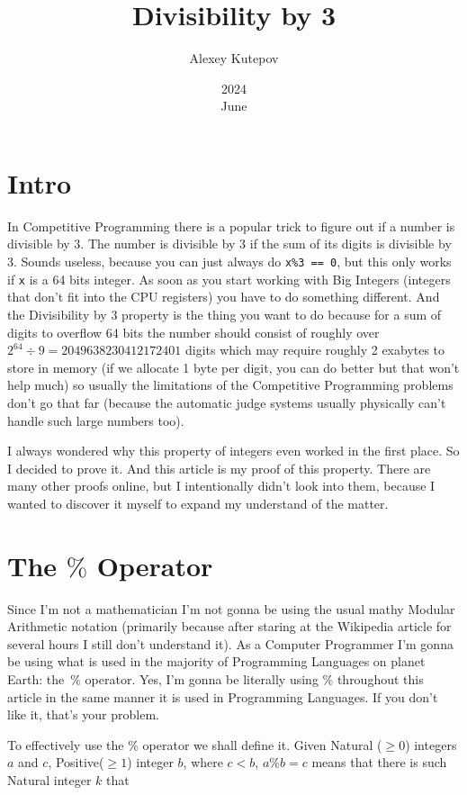 \documentclass{article}
\title{Divisibility by 3}
\date{2024\\ June}
\author{Alexey Kutepov}
\begin{document}
\maketitle
\section{Intro}

In Competitive Programming there is a popular trick to figure out if a
number is divisible by 3. The number is divisible by 3 if the sum of
its digits is divisible by 3. Sounds useless, because you can just
always do \verb|x%3 == 0|, but this only works if \verb|x| is a 64
bits integer. As soon as you start working with Big Integers (integers
that don't fit into the CPU registers) you have to do something
different. And the Divisibility by 3 property is the thing you want to
do because for a sum of digits to overflow 64 bits the number should
consist of roughly over $2^{64} \div 9 = 2049638230412172401$ digits
which may require roughly 2 exabytes to store in memory (if we
allocate 1 byte per digit, you can do better but that won't help much)
so usually the limitations of the Competitive Programming problems
don't go that far (because the automatic judge systems usually
physically can't handle such large numbers too).

I always wondered why this property of integers even worked in the
first place. So I decided to prove it. And this article is my proof of
this property. There are many other proofs online, but I intentionally
didn't look into them, because I wanted to discover it myself to
expand my understand of the matter.

\section{The $\%$ Operator}

Since I'm not a mathematician I'm not gonna be using the usual mathy
Modular Arithmetic notation (primarily because after staring at the
Wikipedia article for several hours I still don't understand it). As a
Computer Programmer I'm gonna be using what is used in the majority of
Programming Languages on planet Earth: the $\%$ operator. Yes, I'm
gonna be literally using $\%$ throughout this article in the same
manner it is used in Programming Languages. If you don't like it,
that's your problem.

To effectively use the $\%$ operator we shall define it. Given Natural
($\ge 0$) integers $a$ and $c$, Positive($\ge 1$) integer $b$, where
$c < b$, $a\%b = c$ means that there is such Natural integer $k$ that
\end{document}
